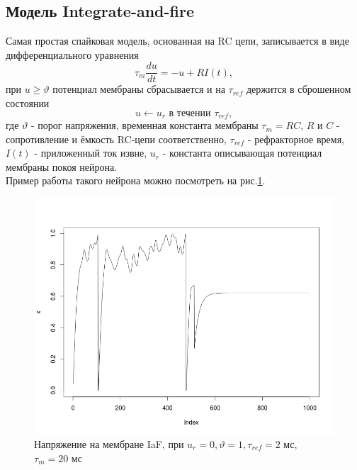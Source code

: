 \documentclass[a4paper,10pt,usenames]{article}
\begin{document}
\subsection{Модель Integrate-and-fire}
\indent Самая простая спайковая модель, основанная на RC цепи, записывается в виде дифференциального уравнения
   \begin{equation}\label{eq:iaf}
   \tau_{m}\frac{du}{dt} =-u+R I(t),
   \end{equation}
при $u \geq \vartheta$ потенциал мембраны сбрасывается и на $\tau_{ref}$ держится в сброшенном состоянии
   \begin{equation}\label{eq:iaf_reset}
   u \leftarrow u_{r} \mbox{ в течении }\tau_{ref}, 
   \end{equation}
   где $\vartheta$ - порог напряжения, временная константа мембраны $\tau_{m}=RC$, $R$ и $C$ - сопротивление и ёмкость RC-цепи соответственно, $\tau_{ref}$ - рефракторное время, $I(t)$ - приложенный ток извне, $u_{r}$ - константа описывающая потенциал мембраны покоя нейрона.\\
   \indent Пример работы такого нейрона можно посмотреть на рис.\ref{iaf_neuron_pic}.\\
\begin{figure}[ht]
\centering
\captionsetup{justification=centering,margin=1cm}
\includegraphics[width=120mm,scale=1]{iaf_profile.png}
\caption{Напряжение на мембране IaF, при $u_{r} = 0, \vartheta = 1, \tau_{ref} = 2$ мс, $\tau_{m} = 20$ мс}
\label{iaf_neuron_pic}
\end{figure}\\
\FloatBarrier
\end{document}
